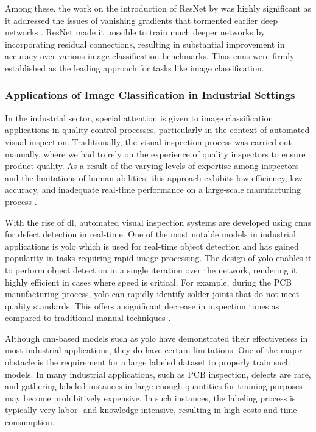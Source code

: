 Among these, the work on the introduction of ResNet by \cite{he2016deep} was highly significant as it addressed the issues of vanishing gradients that tormented earlier deep networks \cite{simonyan2015deepconvolutionalnetworkslargescale} \cite{7298594}. ResNet made it possible to train much deeper networks by incorporating residual connections, resulting in substantial improvement in accuracy over various image classification benchmarks. Thus \glspl{cnn} were firmly established as the leading approach for tasks like image classification.

\subsubsection{Applications of Image Classification in Industrial Settings}

In the industrial sector, special attention is given to image classification applications in quality control processes, particularly in the context of automated visual inspection. Traditionally, the visual inspection process was carried out manually, where we had to rely on the experience of quality inspectors to ensure product quality. As a result of the varying levels of expertise among inspectors and the limitations of human abilities, this approach exhibits low efficiency, low accuracy, and inadequate real-time performance on a large-scale manufacturing process \cite{Gong_2020}.

With the rise of \gls{dl}, automated visual inspection systems are developed using \glspl{cnn} for defect detection in real-time. One of the most notable models in industrial applications is \gls{yolo} which is used for real-time object detection and has gained popularity in tasks requiring rapid image processing. The design of \gls{yolo} enables it to perform object detection in a single iteration over the network, rendering it highly efficient in cases where speed is critical. For example, during the PCB manufacturing process, \gls{yolo} can rapidly identify solder joints that do not meet quality standards. This offers a significant decrease in inspection times as compared to traditional manual techniques \cite{redmon2016you}.

Although \gls{cnn}-based models such as \gls{yolo} have demonstrated their effectiveness in most industrial applications, they do have certain limitations. One of the major obstacle is the requirement for a large labeled dataset to properly train such models. In many industrial applications, such as PCB inspection, defects are rare, and gathering labeled instances in large enough quantities for training purposes may become prohibitively expensive. In such instances, the labeling process is typically very labor- and knowledge-intensive, resulting in high costs and time consumption\cite{FINK2020103678}.

